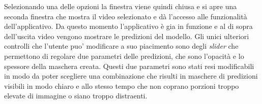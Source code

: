 Selezionando una delle opzioni la finestra viene quindi chiusa
e si apre una seconda finestra che mostra il video selezionato
e dà l'accesso alle funzionalità dell'applicativo.
Da questo momento l'applicativo è gia in funzione
e al di sopra dell'uscita video vengono mostrare le predizioni
del modello.
Gli unici ulteriori controlli che l'utente puo' modificare a
suo piacimento sono degli {\it slider} che permettono di
regolare due parametri delle predizioni, che sono
l'opacità e lo spessore della maschera creata.
Questi due parametri sono stati resi modificabili in modo
da poter scegliere una combinazione che risulti
in maschere di predizioni visibili in modo chiaro e allo
stesso tempo che non coprano porzioni troppo elevate di
immagine o siano troppo distraenti.



